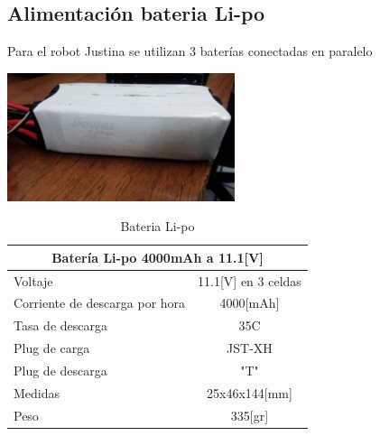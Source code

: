 \documentclass[user_manual.tex]{subfiles}
\begin{document}
\subsection{Alimentación bateria Li-po}

Para el robot Justina se utilizan 3 baterías conectadas en paralelo

\begin{center}
\includegraphics[width=0.5\textwidth]{Figures/Hardware/Partes/Li-po_Battery.jpg}
\label{fig:Hardware:Partes:Battery}
\end{center}

\begin{table}[H]
\begin{center}
\begin{tabular}{|l|l|}%

\hline
\multicolumn{2}{|c|}{Batería Li-po 4000mAh a 11.1[V]} \\ \hline %
Voltaje &  \multicolumn{1}{|c|}{11.1[V] en 3 celdas}\\ \hline
Corriente de descarga por hora  & \multicolumn{1}{|c|}{4000[mAh]}\\ \hline
Tasa de descarga & \multicolumn{1}{|c|}{35C}\\ \hline
Plug de carga & \multicolumn{1}{|c|}{JST-XH}\\ \hline
Plug de descarga & \multicolumn{1}{|c|}{"T"}\\ \hline
Medidas & \multicolumn{1}{|c|}{25x46x144[mm]}\\ \hline
Peso & \multicolumn{1}{|c|}{335[gr]}\\ \hline

\end{tabular}
\caption{Bateria Li-po}
\label{Battery}
\end{center}
\end{table}

%
\end{document}
